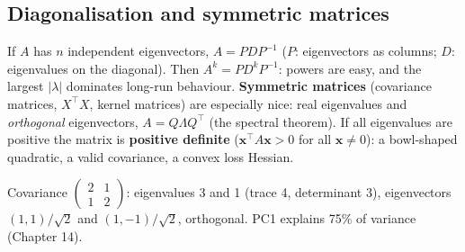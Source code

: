 \subsection{Diagonalisation and symmetric matrices}
If $A$ has $n$ independent eigenvectors, $A = PDP^{-1}$ ($P$: eigenvectors as columns; $D$: eigenvalues on the diagonal). Then $A^k = PD^kP^{-1}$: powers are easy, and the
largest $|\lambda|$ dominates long-run behaviour.
\textbf{Symmetric matrices} (covariance matrices, $X^\top X$, kernel matrices) are especially nice: real eigenvalues and \emph{orthogonal} eigenvectors, $A = Q\Lambda Q^\top$ (the spectral
theorem). If all eigenvalues are positive the matrix is \textbf{positive definite} ($\mathbf x^\top A\mathbf x > 0$ for all $\mathbf x\ne0$): a bowl-shaped quadratic, a valid covariance, a
convex loss Hessian.
\begin{example}
Covariance $\begin{pmatrix}2 & 1\\1 & 2\end{pmatrix}$: eigenvalues 3 and 1 (trace 4, determinant 3), eigenvectors $(1,1)/\sqrt2$ and $(1,-1)/\sqrt2$, orthogonal. PC1 explains 75\% of
variance (Chapter 14).
\end{example}

